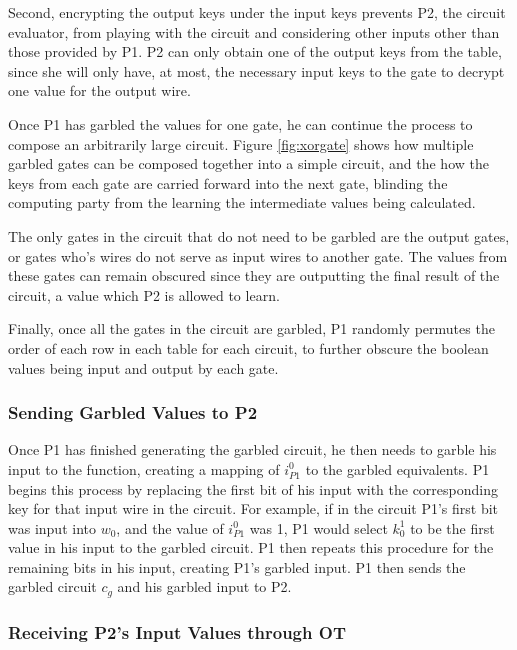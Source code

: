 Second, encrypting the output keys under the input keys prevents \ac{P2}, the circuit evaluator, from playing with the circuit and considering other inputs other than those provided by \ac{P1}. \ac{P2} can only obtain one of the output keys from the table, since she will only have, at most, the necessary input keys to the gate to decrypt one value for the output wire.

Once \ac{P1} has garbled the values for one gate, he can continue the process to compose an arbitrarily large circuit.  Figure \ref{fig:xorgate} shows how multiple garbled gates can be composed together into a simple circuit, and the how the keys from each gate are carried forward into the next gate, blinding the computing party from the learning the intermediate values being calculated.

The only gates in the circuit that do not need to be garbled are the output gates, or gates who's wires do not serve as input wires to another gate.  The values from these gates can remain obscured since they are outputting the final result of the circuit, a value which \ac{P2} is allowed to learn.

Finally, once all the gates in the circuit are garbled, \ac{P1} randomly permutes the order of each row in each table for each circuit, to further obscure the boolean values being input and output by each gate.

\subsubsection{Sending Garbled Values to \ac{P2}}

Once \ac{P1} has finished generating the garbled circuit, he then needs to garble his input to the function, creating a mapping of $i^0_{P1}$ to the garbled equivalents.  \ac{P1} begins this process by replacing the first bit of his input with the corresponding key for that input wire in the circuit.  For example, if in the circuit \ac{P1}'s first bit was input into $w_0$, and the value of $i^0_{P1}$ was 1, \ac{P1} would select $k^1_0$ to be the first value in his input to the garbled circuit. \ac{P1} then repeats this procedure for the remaining bits in his input, creating \ac{P1}'s garbled input. \ac{P1} then sends the garbled circuit $c_g$ and his garbled input to \ac{P2}.

\subsubsection{Receiving \ac{P2}'s Input Values through \ac{OT}}

